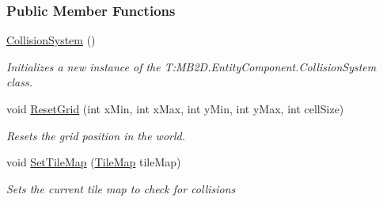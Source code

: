 \subsubsection*{Public Member Functions}
\begin{DoxyCompactItemize}
\item 
\hyperlink{class_m_b2_d_1_1_entity_component_1_1_collision_system_ac6452aea90e8ee3376b8ea0e089bebc1}{Collision\+System} ()
\begin{DoxyCompactList}\small\item\em Initializes a new instance of the T\+:\+M\+B2\+D.\+Entity\+Component.\+Collision\+System class. \end{DoxyCompactList}\item 
void \hyperlink{class_m_b2_d_1_1_entity_component_1_1_collision_system_a682979b3b811fede89b625cc42b6342c}{Reset\+Grid} (int x\+Min, int x\+Max, int y\+Min, int y\+Max, int cell\+Size)
\begin{DoxyCompactList}\small\item\em Resets the grid position in the world. \end{DoxyCompactList}\item 
void \hyperlink{class_m_b2_d_1_1_entity_component_1_1_collision_system_a4710a6cf7aba7b5ba9c75e0771793b93}{Set\+Tile\+Map} (\hyperlink{class_m_b2_d_1_1_tiles_1_1_tile_map}{Tile\+Map} tile\+Map)
\begin{DoxyCompactList}\small\item\em Sets the current tile map to check for collisions \end{DoxyCompactList}\end{DoxyCompactItemize}
